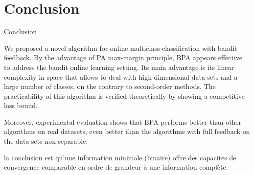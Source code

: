 \documentclass[twocolumn]{article}
\begin{document}
\section{Conclusion}
\label{sec:conclusion}
{Conclusion}
\label{subsec:BPAC}

We proposed a novel algorithm for online multiclass classification with bandit feedback. By the advantage of PA max-margin principle, BPA appears effective to address the bandit online learning setting. Its main advantage is its linear complexity in space that allows to deal with high dimensional data sets and a large number of classes, on the contrary to second-order methods. The practicability of this algorithm is verified theoretically by showing a competitive loss bound.

Moreover, experimental evaluation shows that BPA performs better than other algorithms on  real datasets, even better than the algorithms with full feedback on the data sets non-separable.


la conclusion est qu’une information minimale (binaire) offre des capacites de convergence comparable en ordre de grandeur à une information complète.



\end{document}
